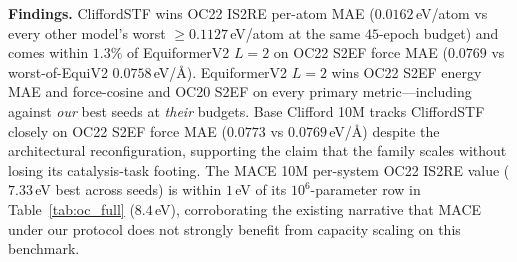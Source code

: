 \begin{table}[h]
\centering
\caption{\textbf{$10^7$-parameter scaling check}. The MACE OC22 IS2RE cell additionally carries the per-system $\mathrm{val\_id\_mae}$ in brackets as a cross-scale calibration anchor with Table~\ref{tab:oc_full}.}
\label{tab:scaling_check}
\setlength{\tabcolsep}{3pt}
\scriptsize
{}
\end{table}

\textbf{Findings.} CliffordSTF wins OC22 IS2RE per-atom MAE ($0.0162$\,eV/atom vs every other model's worst $\geq 0.1127$\,eV/atom at the same $45$-epoch budget) and comes within $1.3\%$ of EquiformerV2 $L{=}2$ on OC22 S2EF force MAE ($0.0769$ vs worst-of-EquiV2 $0.0758$\,eV/\AA{}). EquiformerV2 $L{=}2$ wins OC22 S2EF energy MAE and force-cosine and OC20 S2EF on every primary metric---including against \emph{our} best seeds at \emph{their} budgets. Base Clifford 10M tracks CliffordSTF closely on OC22 S2EF force MAE ($0.0773$ vs $0.0769$\,eV/\AA{}) despite the architectural reconfiguration, supporting the claim that the family scales without losing its catalysis-task footing. The MACE 10M per-system OC22 IS2RE value ($7.33$\,eV best across seeds) is within $1$\,eV of its $10^6$-parameter row in Table~\ref{tab:oc_full} ($8.4$\,eV), corroborating the existing narrative that MACE under our protocol does not strongly benefit from capacity scaling on this benchmark.


